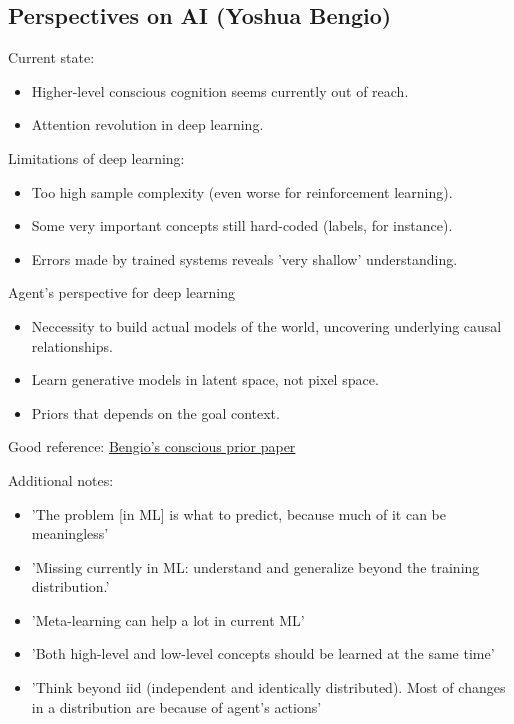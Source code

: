 \documentclass[12pt, english]{article}
\begin{document}
\subsection{Perspectives on AI (Yoshua Bengio)}

Current state:

\begin{itemize}
  \item Higher-level conscious cognition seems currently out of reach.
  \item Attention revolution in deep learning.
\end{itemize}

Limitations of deep learning:

\begin{itemize}
  \item Too high sample complexity (even worse for reinforcement learning).
  \item Some very important concepts still hard-coded (labels, for instance).
  \item Errors made by trained systems reveals 'very shallow' understanding.
\end{itemize}

Agent's perspective for deep learning
\begin{itemize}
  \item Neccessity to build actual models of the world, uncovering underlying causal relationships.
  \item Learn generative models in latent space, not pixel space.
  \item Priors that depends on the goal context.
\end{itemize}

Good reference: \href{https://arxiv.org/abs/1709.08568}{Bengio's conscious prior paper}

Additional notes:

\begin{itemize}
  \item 'The problem [in ML] is what to predict, because much of it can be meaningless'
  \item 'Missing currently in ML: understand and generalize beyond the training distribution.'
  \item 'Meta-learning can help a lot in current ML'
  \item 'Both high-level and low-level concepts should be learned at the same time'
  \item 'Think beyond iid (independent and identically distributed). Most of changes in a distribution are because of agent's actions'
\end{itemize}
\end{document}
